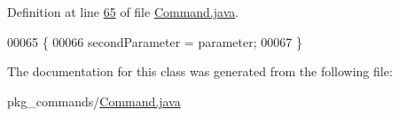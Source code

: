 Definition at line \hyperlink{Command_8java_source_l00065}{65} of file \hyperlink{Command_8java_source}{Command.\-java}.


\begin{DoxyCode}
00065                                                      \{
00066         secondParameter = parameter;
00067     \}
\end{DoxyCode}


The documentation for this class was generated from the following file\-:\begin{DoxyCompactItemize}
\item 
pkg\-\_\-commands/\hyperlink{Command_8java}{Command.\-java}\end{DoxyCompactItemize}
